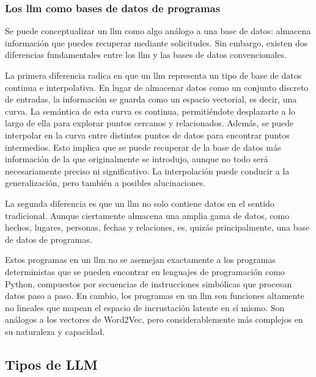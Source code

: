 
\subsubsection{Los \acrshort{llm} como bases de datos de programas}

Se puede conceptualizar un \acrfull{llm} como algo análogo a una base de datos: almacena información que puedes recuperar mediante solicitudes. Sin embargo, existen dos diferencias fundamentales entre los \acrshort{llm} y las bases de datos convencionales.

La primera diferencia radica en que un \acrshort{llm} representa un tipo de base de datos continua e interpolativa. En lugar de almacenar datos como un conjunto discreto de entradas, la información se guarda como un espacio vectorial, es decir, una curva. La semántica de esta curva es continua, permitiéndote desplazarte a lo largo de ella para explorar puntos cercanos y relacionados. Además, se puede interpolar en la curva entre distintos puntos de datos para encontrar puntos intermedios. Esto implica que se puede recuperar de la base de datos más información de la que originalmente se introdujo, aunque no todo será necesariamente preciso ni significativo. La interpolación puede conducir a la generalización, pero también a posibles alucinaciones.

La segunda diferencia es que un \acrshort{llm} no solo contiene datos en el sentido tradicional. Aunque ciertamente almacena una amplia gama de datos, como hechos, lugares, personas, fechas y relaciones, es, quizás principalmente, una base de datos de programas.

Estos programas en un \acrshort{llm} no se asemejan exactamente a los programas deterministas que se pueden encontrar en lenguajes de programación como Python, compuestos por secuencias de instrucciones simbólicas que procesan datos paso a paso. En cambio, los programas en un \acrshort{llm} son funciones altamente no lineales que mapean el espacio de incrustación latente en sí mismo. Son análogos a los vectores de Word2Vec, pero considerablemente más complejos en su naturaleza y capacidad.

\subsection{Tipos de LLM}

